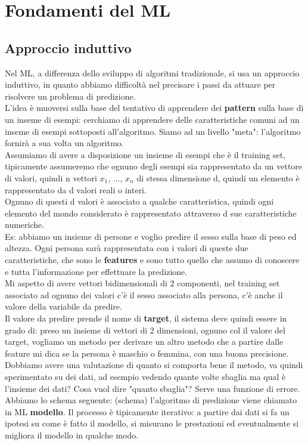 \documentclass[12pt, oneside]{extbook}
\begin{document}
\chapter{Fondamenti del ML}
\section{Approccio induttivo}
Nel ML, a differenza dello sviluppo di algoritmi tradizionale, si usa un approccio induttivo, in quanto abbiamo difficoltà nel precisare i passi da attuare per risolvere un problema di predizione.\\L'idea è muoversi sulla base del tentativo di apprendere dei \textbf{pattern} sulla base di un inseme di esempi: cerchiamo di apprendere delle caratteristiche comuni ad un inseme di esempi sottoposti all'algoritmo. Siamo ad un livello "meta": l'algoritmo fornirà a sua volta un algoritmo.\\Assumiamo di avere a disposizione un insieme di esempi che è il training set, tipicamente assumeremo che ognuno degli esempi sia rappresentato da un vettore di valori, quindi n vettori $x_1$, ..., $x_n$ di stessa dimensione d, quindi un elemento è rappresentato da d valori reali o interi.\\Ognuno di questi d valori è associato a qualche caratteristica, quindi ogni elemento del mondo considerato è rappresentato attraverso d sue caratteristiche numeriche.\\Es: abbiamo un insieme di persone e voglio predire il sesso sulla base di peso ed altezza. Ogni persona sarà rappresentata con i valori di queste due caratteristiche, che sono le \textbf{features} e sono tutto quello che assumo di conoscere e tutta l'informazione per effettuare la predizione.\\Mi aspetto di avere vettori bidimensionali di 2 componenti, nel training set associato ad ognuno dei valori c'è il sesso associato alla persona, c'è anche il valore della variabile da predire.\\Il valore da predire prende il nome di \textbf{target}, il sistema deve quindi essere in grado di: preso un insieme di vettori di 2 dimensioni, ognuno col il valore del target, vogliamo un metodo per derivare un altro metodo che a partire dalle feature mi dica se la persona è maschio o femmina, con una buona precisione.\\Dobbiamo avere una valutazione di quanto si comporta bene il metodo, va quindi sperimentato su dei dati, ad esempio vedendo quante volte sbaglia ma qual è l'insieme dei dati? Cosa vuol dire "quanto sbaglia"? Serve una funzione di errore.\\Abbiamo lo schema seguente:
(schema)
l'algoritmo di predizione viene chiamato in ML \textbf{modello}. Il processo è tipicamente iterativo: a partire dai dati si fa un ipotesi su come è fatto il modello, si misurano le prestazioni ed eventualmente si migliora il modello in qualche modo.
\end{document}

